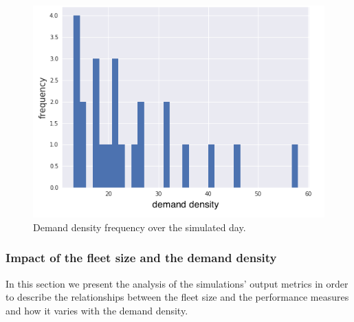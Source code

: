 \documentclass[12pt,a4paper]{article}
\begin{document}
\begin{figure} 
  \centering
\includegraphics[scale=0.6]{./images/demand_freq.png}
  \caption{Demand density frequency over the simulated day.}
\label{demfreq}
\end{figure}


\tiny{
}


\normalsize
\subsubsection{Impact of the fleet size and the demand density}\label{impact}
In this section we present the analysis of the simulations' output metrics in order to describe the relationships between the fleet size and the performance measures and how it varies with the demand density.
\end{document}
